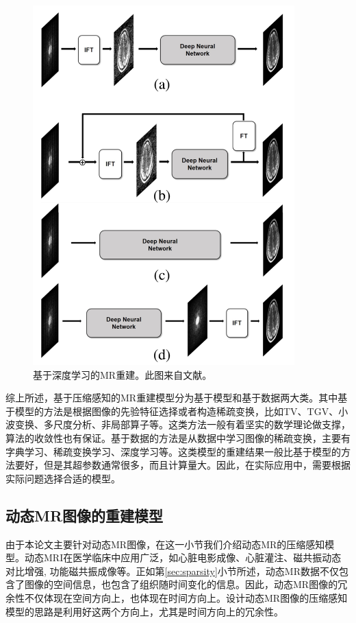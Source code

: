 \begin{figure}[htbp]
\centering
\includegraphics[width=0.9\textwidth]{img/intro/deepmri.png}
\caption{基于深度学习的MR重建。此图来自文献\cite{ye2019compressed}。}
\label{fig:deepmri}
\end{figure}

综上所述，基于压缩感知的MR重建模型分为基于模型和基于数据两大类。其中基于模型的方法是根据图像的先验特征选择或者构造稀疏变换，比如TV、TGV、小波变换、多尺度分析、非局部算子等。这类方法一般有着坚实的数学理论做支撑，算法的收敛性也有保证。基于数据的方法是从数据中学习图像的稀疏变换，主要有字典学习、稀疏变换学习、深度学习等。这类模型的重建结果一般比基于模型的方法要好，但是其超参数通常很多，而且计算量大。因此，在实际应用中，需要根据实际问题选择合适的模型。

\subsection{动态MR图像的重建模型}
\label{sec:dmri}
由于本论文主要针对动态MR图像，在这一小节我们介绍动态MR的压缩感知模型。动态MRI在医学临床中应用广泛，如心脏电影成像、心脏灌注、磁共振动态对比增强, 功能磁共振成像等。正如第\ref{sec:sparsity}小节所述，动态MR数据不仅包含了图像的空间信息，也包含了组织随时间变化的信息。因此，动态MR图像的冗余性不仅体现在空间方向上，也体现在时间方向上。设计动态MR图像的压缩感知模型的思路是利用好这两个方向上，尤其是时间方向上的冗余性。

